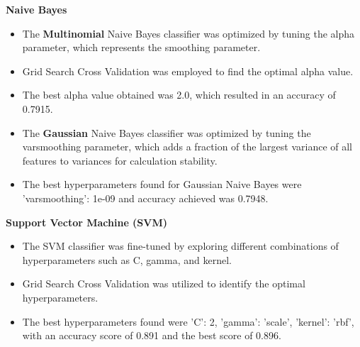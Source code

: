 \documentclass[a4paper]{article}
\theoremstyle{plain}
\theoremstyle{definition}
\begin{document}
\begin{enumerate}
\textbf{Naive Bayes}
\begin{itemize}
    \item The \textbf{Multinomial} Naive Bayes classifier was optimized by tuning the alpha parameter, which represents the smoothing parameter.
    \item Grid Search Cross Validation was employed to find the optimal alpha value.
    \item The best alpha value obtained was 2.0, which resulted in an accuracy of 0.7915.
    \item The \textbf{Gaussian} Naive Bayes classifier was optimized by tuning the var\textunderscore smoothing parameter, which adds a fraction of the largest variance of all features to variances for calculation stability.
    \item The best hyperparameters found for Gaussian Naive Bayes were {'var\textunderscore smoothing': 1e-09} and accuracy achieved was 0.7948.
\end{itemize}

\textbf{Support Vector Machine (SVM)}
\begin{itemize}
    \item The SVM classifier was fine-tuned by exploring different combinations of hyperparameters such as C, gamma, and kernel.
    \item Grid Search Cross Validation was utilized to identify the optimal hyperparameters.
    \item The best hyperparameters found were {'C': 2, 'gamma': 'scale', 'kernel': 'rbf'}, with an accuracy score of 0.891 and the best score of 0.896.
\end{itemize}
\vspace{0.5cm}

\begin{table}[h!]
\centering
\caption{\textbf{Results of Accuracy After Hyperparameter Tuning}}
\label{my-label}
\end{table}
\end{enumerate}
\end{document}
